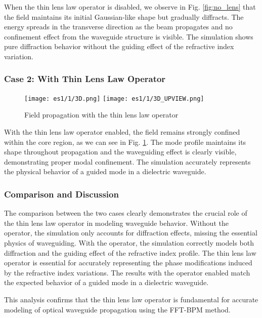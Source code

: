 \documentclass{article}
\begin{document}
When the thin lens law operator is disabled, we observe in Fig. \ref{fig:no_lens} that the field maintains its initial Gaussian-like shape but gradually diffracts. The energy spreads in the transverse direction as the beam propagates and no confinement effect from the waveguide structure is visible. The simulation shows pure diffraction behavior without the guiding effect of the refractive index variation.

\subsubsection{Case 2: With Thin Lens Law Operator}
\begin{figure}[h]
\centering
\texttt{[image: es1/1/3D.png]}
\texttt{[image: es1/1/3D\_UPVIEW.png]}
\caption{Field propagation with the thin lens law operator}
\label{fig:with_lens}
\end{figure}

With the thin lens law operator enabled, the field remains strongly confined within the core region, as we can see in Fig. \ref{fig:with_lens}. The mode profile maintains its shape throughout propagation and the waveguiding effect is clearly visible, demonstrating proper modal confinement. The simulation accurately represents the physical behavior of a guided mode in a dielectric waveguide.

\subsubsection{Comparison and Discussion}
The comparison between the two cases clearly demonstrates the crucial role of the thin lens law operator in modeling waveguide behavior. Without the operator, the simulation only accounts for diffraction effects, missing the essential physics of waveguiding. With the operator, the simulation correctly models both diffraction and the guiding effect of the refractive index profile. The thin lens law operator is essential for accurately representing the phase modifications induced by the refractive index variations. The results with the operator enabled match the expected behavior of a guided mode in a dielectric waveguide.

This analysis confirms that the thin lens law operator is fundamental for accurate modeling of optical waveguide propagation using the FFT-BPM method.
\end{document}
